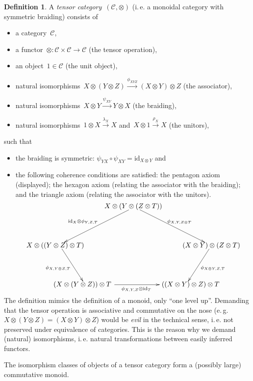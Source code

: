 \documentclass[a4paper,english,12pt]{scrartcl}
\theoremstyle{definition}
\newtheorem{defn}{Definition}[section]
\theoremstyle{plain}
\theoremstyle{remark}
\newcommand{\C}{\mathcal{C}}
\newcommand{\id}{\mathrm{id}}
\newcommand{\xra}[1]{\xrightarrow{#1}}
\renewcommand{\_}{\mathpunct{.}\,}
\newcommand{\?}{\,{:}\,}
\begin{document}
\begin{defn}A \emph{tensor category}~$(\C,\otimes)$ (i.\,e. a monoidal category with
symmetric braiding) consists of
\begin{itemize}
\item a category~$\C$,
\item a functor~${\otimes} : \C \times \C \to \C$ (the tensor operation),
\item an object~$1 \in \C$ (the unit object),
\item natural isomorphisms~$X \otimes (Y \otimes Z) \xra{\phi_{XYZ}} (X \otimes
Y) \otimes Z$ (the associator),
\item natural isomorphisms~$X \otimes Y \xra{\psi_{XY}} Y \otimes X$ (the
braiding),
\item natural isomorphisms~$1 \otimes X \xra{\lambda_X} X$ and~$X \otimes 1
\xra{\rho_X} X$ (the unitors),
\end{itemize}
such that
\begin{itemize}
\item the braiding is symmetric: $\psi_{YX} \circ \psi_{XY} = \id_{X \otimes
Y}$ and
\item the following coherence conditions are satisfied: the pentagon axiom
(displayed); the hexagon axiom (relating the associator with the braiding); and
the triangle axiom (relating the associator with the unitors).
\[ \xy
(0,20)*{X \otimes (Y \otimes (Z \otimes T))}="1"; 
(40,0)*{(X \otimes Y) \otimes (Z \otimes T)}="2"; 
(27,-20)*{\quad\ ((X \otimes Y) \otimes Z) \otimes T}="3"; 
(-27,-20)*{(X \otimes (Y \otimes Z)) \otimes T\!\!\!}="4"; 
(-40,0)*{X \otimes ((Y \otimes Z) \otimes T)}="5"; 
{\ar^{\phi_{X,Y,Z \otimes T}} "1";"2"} 
{\ar^{\phi_{X\otimes Y,Z,T}} "2";"3"} 
{\ar_{\id_X \otimes \phi_{Y,Z,T}\quad} "1";"5"} 
{\ar_{\phi_{X,Y\otimes Z,T}} "5";"4"} 
{\ar_{\!\!\!\!\!\!\!\!\phi_{X,Y,Z} \otimes \id_T} "4";"3"} 
\endxy \]
\end{itemize}
\end{defn}

The definition mimics the definition of a monoid, only ``one level up''.
Demanding that the tensor operation is associative and commutative on the nose
(e.\,g. $X \otimes (Y \otimes Z) = (X \otimes Y) \otimes Z$) would be
\emph{evil} in the technical sense, i.\,e. not preserved under equivalence of
categories. This is the reason why we demand (natural) isomorphisms, i.\,e.
natural transformations between easily inferred functors.

The isomorphism classes of objects of a tensor category form a (possibly large) commutative monoid.
\end{document}
